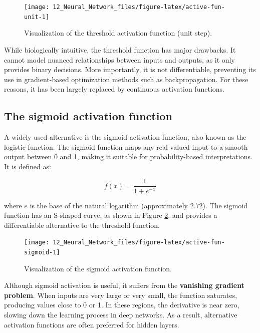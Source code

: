 \documentclass[
  11pt,
]{book}
\theoremstyle{definition}
\theoremstyle{definition}
\theoremstyle{definition}
\theoremstyle{definition}
\theoremstyle{remark}
\begin{document}
\begin{figure}[H]

{\centering \texttt{[image: 12\_Neural\_Network\_files/figure-latex/active-fun-unit-1]} 

}

\caption{Visualization of the threshold activation function (unit step).}\label{fig:active-fun-unit}
\end{figure}

While biologically intuitive, the threshold function has major drawbacks. It cannot model nuanced relationships between inputs and outputs, as it only provides binary decisions. More importantly, it is not differentiable, preventing its use in gradient-based optimization methods such as backpropagation. For these reasons, it has been largely replaced by continuous activation functions.

\subsection*{The sigmoid activation function}\label{the-sigmoid-activation-function}


A widely used alternative is the sigmoid activation function, also known as the logistic function. The sigmoid function maps any real-valued input to a smooth output between 0 and 1, making it suitable for probability-based interpretations. It is defined as:

\[
f(x) = \frac{1}{1 + e^{-x}}
\]

where \(e\) is the base of the natural logarithm (approximately 2.72). The sigmoid function has an S-shaped curve, as shown in Figure \ref{fig:active-fun-sigmoid}, and provides a differentiable alternative to the threshold function.

\begin{figure}[H]

{\centering \texttt{[image: 12\_Neural\_Network\_files/figure-latex/active-fun-sigmoid-1]} 

}

\caption{Visualization of the sigmoid activation function.}\label{fig:active-fun-sigmoid}
\end{figure}

Although sigmoid activation is useful, it suffers from the \textbf{vanishing gradient problem}. When inputs are very large or very small, the function saturates, producing values close to 0 or 1. In these regions, the derivative is near zero, slowing down the learning process in deep networks. As a result, alternative activation functions are often preferred for hidden layers.
\end{document}
